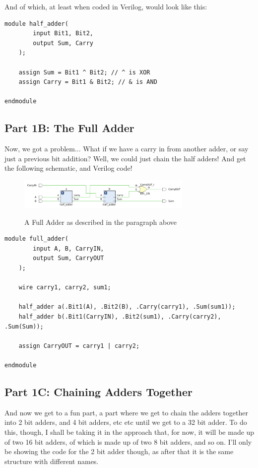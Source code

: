 \documentclass{article}
\begin{document}
And of which, at least when coded in Verilog, would look like this:
\begin{lstlisting}[caption={Half Adder Verilog Code}, label={Half Adder Verilog}, style=Verilog]
module half_adder(
        input Bit1, Bit2,
        output Sum, Carry
    );
    
    assign Sum = Bit1 ^ Bit2; // ^ is XOR
    assign Carry = Bit1 & Bit2; // & is AND
    
endmodule
\end{lstlisting}

\subsection{Part 1B: The Full Adder}
\qquad
Now, we got a problem... What if we have a carry in from another adder, or say just a previous bit addition? Well, we could just chain the half adders! And get the following schematic, and Verilog code!
\begin{figure}[!htbp]
    \centering
    \caption{A Full Adder as described in the paragraph above}
    \includegraphics[width=0.75\textwidth]{pictures/part1/full_adder.png}
    \label{Full Adder}
\end{figure}
\begin{lstlisting}[caption={Full Adder Verilog Code}, label={Full Adder Verilog}, style=Verilog]
module full_adder(
        input A, B, CarryIN,
        output Sum, CarryOUT
    );
    
    wire carry1, carry2, sum1;
    
    half_adder a(.Bit1(A), .Bit2(B), .Carry(carry1), .Sum(sum1));
    half_adder b(.Bit1(CarryIN), .Bit2(sum1), .Carry(carry2), .Sum(Sum));
    
    assign CarryOUT = carry1 | carry2; 
    
endmodule
\end{lstlisting}

\subsection{Part 1C: Chaining Adders Together}
\qquad And now we get to a fun part, a part where we get to chain the adders together into 2 bit adders, and 4 bit adders, etc etc until we get to a 32 bit adder. To do this, though, I shall be taking it in the approach that, for now, it will be made up of two 16 bit adders, of which is made up of two 8 bit adders, and so on. I'll only be showing the code for the 2 bit adder though, as after that it is the same structure with different names.\\
\end{document}
